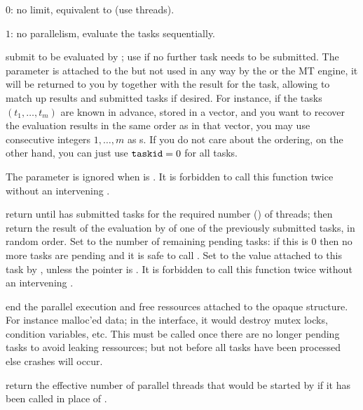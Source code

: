 {\item $0$: no limit, equivalent to  (use
 threads).

\item $1$: no parallelism, evaluate the tasks sequentially.

 submit
 to be evaluated by ; use  if no
further task needs to be submitted. The parameter  is attached to
the  but not used in any way by the  or the MT engine,
it will be returned to you by  together with the result
for the task, allowing to match up results and submitted tasks if desired.
For instance, if the tasks $(t_1,\dots, t_m)$ are known in advance, stored in
a vector, and you want to recover the evaluation results in the same order as
in that vector, you may use consecutive integers $1, \dots, m$ as
s. If you do not care about the ordering, on the other hand, you
can just use ${\tt taskid} = 0$ for all tasks.

The  parameter is ignored when  is . It is
forbidden to call this function twice without an intervening
.

return  until  has submitted
tasks for the required number () of threads; then return the
result of the evaluation by  of one of the previously submitted
tasks, in random order. Set  to the number of remaining pending
tasks: if this is $0$ then no more tasks are pending and it is safe to call
. Set  to the value attached to this task by
, unless the  pointer is . It is
forbidden to call this function twice without an intervening
.

 end the parallel execution
and free ressources attached to the opaque  structure. For
instance malloc'ed data; in the  interface, it would destroy
mutex locks, condition variables, etc. This must be called once there are no
longer pending tasks to avoid leaking ressources; but not before all tasks
have been processed else crashes will occur.

 return the effective number of parallel threads
that would be started by  if it has been called in place
of .

}
